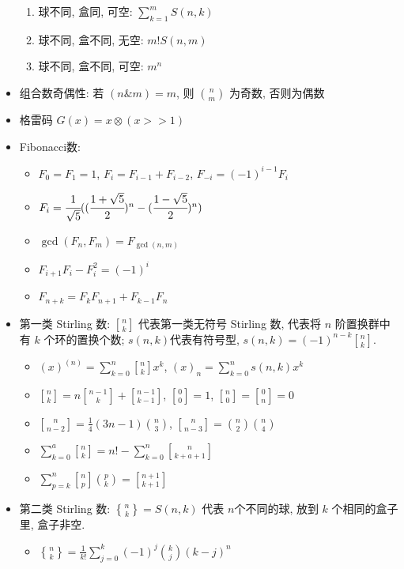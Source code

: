 \documentclass[landscape, twocolumn, 8pt, a4paper, twoside]{extarticle}
\newcommand{\stlf}[2]{\genfrac{ [ }{ ] }{0pt}{}{#1}{#2}}
\newcommand{\stls}[2]{\genfrac{ \{ }{ \} }{0pt}{}{#1}{#2}}
\begin{document}
\begin{itemize}
\begin{enumerate}
  \item 球不同, 盒同, 可空: $\sum_{k = 1}^{m} S(n, k)$
  \item 球不同, 盒不同, 无空: $m! S(n, m)$
  \item 球不同, 盒不同, 可空: $m^n$
  \end{enumerate}
\item 组合数奇偶性: 若 $(n \& m) = m$, 则 $\binom{n}{m}$ 为奇数, 否则为偶数
\item 格雷码 $G(x) = x \otimes (x >> 1) $
\item Fibonacci数: 
  \begin{itemize}
  \item $F_0 = F_1 = 1$, $F_i = F_{i - 1} + F_{i - 2}$, $F_{-i} = (-1) ^ {i - 1} F_i$
  \item $F_i = \cfrac{1}{\sqrt{5}} ((\cfrac{1 + \sqrt{5}}{2}) ^ n - (\cfrac{1 - \sqrt{5}}{2}) ^ {n}) $
  \item $\gcd(F_n,F_m)=F_{\gcd(n,m)}$
  \item $F_{i + 1} F_i - F_i^2 = (-1) ^ i$
  \item $F_{n + k} = F_k F_{n + 1} + F_{k - 1} F_n$
  \end{itemize}
\item 第一类 Stirling 数: $\stlf{n}{k}$ 代表第一类无符号 Stirling 数, 代表将 $n$ 阶置换群中有 $k$ 个环的置换个数; $s(n,k)$代表有符号型, $s(n, k) = (-1)^{n - k}\stlf{n}{k}$.
  \begin{itemize}
  \item $(x)^{(n)} = \sum\limits_{k = 0}^{n}\stlf{n}{k}x ^k$, $(x)_{n} = \sum\limits_{k = 0}^{n} s(n, k) x ^k$
  \item $\stlf{n}{k} = n\stlf{n - 1}{k} + \stlf{n - 1}{k - 1}$, $\stlf{0}{0} = 1$, $\stlf{n}{0} = \stlf{0}{n} = 0$
  \item $\stlf{n}{n - 2} = \frac{1}{4} (3n - 1) \binom{n}{3} $, $\stlf{n}{n - 3} = \binom{n}{2} \binom{n}{4} $
  \item $\sum\limits_{k = 0}^{a}\stlf{n}{k} = n! - \sum\limits_{k = 0}^{n} \stlf{n}{k + a + 1}$
  \item $\sum\limits_{p = k}^{n}\stlf{n}{p}\binom{p}{k} = \stlf{n + 1}{k + 1}$
  \end{itemize}
\item 第二类 Stirling 数: $\stls{n}{k} = S(n, k)$ 代表 $n$个不同的球, 放到 $k$ 个相同的盒子里, 盒子非空.
  \begin{itemize}
  \item $\stls{n}{k} = \frac{1}{k!} \sum\limits_{j = 0}^{k} (-1)^j \binom{k}{j} (k - j)^n$

\end{itemize}
\end{itemize}
\end{document}
